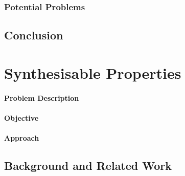 \documentclass[a4paper]{article}
\begin{document}

\subsubsection{Potential Problems} %
\label{sec:BoringFlops_potentialProblems}



\subsection{Conclusion} %
\label{sec:BoringFlops_conclusion}



\section{Synthesisable Properties} %
\label{sec:SynthesisableProperties}

\paragraph{Problem Description} %
\label{sec:SynthesisableProperties_problem}


\paragraph{Objective} %
\label{sec:SynthesisableProperties_objective}


\paragraph{Approach} %
\label{sec:SynthesisableProperties_approach}


\subsection{Background and Related Work} %
\label{sec:SynthesisableProperties_background}
\end{document}
